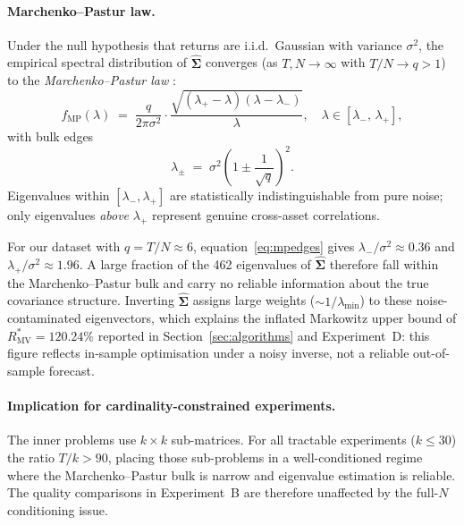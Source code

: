 \documentclass[11pt]{article}
\begin{document}
\paragraph{Marchenko--Pastur law.}
Under the null hypothesis that returns are i.i.d.\ Gaussian with variance
$\sigma^2$, the empirical spectral distribution of $\hat{\boldsymbol{\Sigma}}$
converges (as $T,N\to\infty$ with $T/N\to q>1$) to the
\emph{Marchenko--Pastur law} \cite{MarchenkoPastur1967}:
\begin{equation}
  f_{\mathrm{MP}}(\lambda)
  \;=\;
  \frac{q}{2\pi\sigma^2}
  \cdot
  \frac{\sqrt{(\lambda_+ - \lambda)(\lambda - \lambda_-)}}{\lambda},
  \quad \lambda\in[\lambda_-,\,\lambda_+],
  \label{eq:mp}
\end{equation}
with bulk edges
\begin{equation}
  \lambda_{\pm} \;=\; \sigma^2\!\left(1 \pm \frac{1}{\sqrt{q}}\right)^{\!2}.
  \label{eq:mpedges}
\end{equation}
Eigenvalues within $[\lambda_-,\lambda_+]$ are statistically indistinguishable
from pure noise; only eigenvalues \emph{above} $\lambda_+$ represent genuine
cross-asset correlations.

For our dataset with $q=T/N\approx 6$, equation~\eqref{eq:mpedges} gives
$\lambda_-/\sigma^2\approx 0.36$ and $\lambda_+/\sigma^2\approx 1.96$.
A large fraction of the 462 eigenvalues of $\hat{\boldsymbol{\Sigma}}$ therefore
fall within the Marchenko--Pastur bulk and carry no reliable information about
the true covariance structure.  Inverting $\hat{\boldsymbol{\Sigma}}$ assigns
large weights ($\sim 1/\lambda_{\min}$) to these noise-contaminated eigenvectors,
which explains the inflated Markowitz upper bound of $R^*_{\text{MV}}=120.24\%$
reported in Section~\ref{sec:algorithms} and Experiment~D: this figure reflects
in-sample optimisation under a noisy inverse, not a reliable out-of-sample forecast.

\paragraph{Implication for cardinality-constrained experiments.}
The inner problems use $k\times k$ sub-matrices.  For all tractable experiments
($k\leq 30$) the ratio $T/k>90$, placing those sub-problems in a well-conditioned
regime where the Marchenko--Pastur bulk is narrow and eigenvalue estimation is
reliable.  The quality comparisons in Experiment~B are therefore unaffected by
the full-$N$ conditioning issue.
\end{document}
